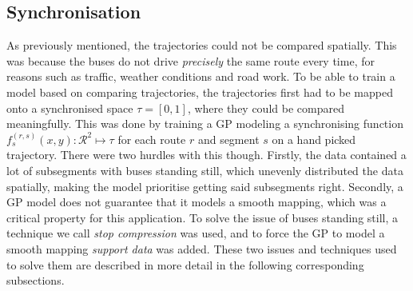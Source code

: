 \subsection{Synchronisation}
As previously mentioned, the trajectories could not be compared spatially. This was because the buses do not drive \textit{precisely} the same route every time, for reasons such as traffic, weather conditions and road work. To be able to train a model based on comparing trajectories, the trajectories first had to be mapped onto a synchronised space $\tau = [0, 1]$, where they could be compared meaningfully. This was done by training a GP modeling a synchronising function $f^{(r,s)}_s(x, y) : \mathcal{R}^2 \mapsto \tau$ for each route $r$ and segment $s$ on a hand picked trajectory. There were two hurdles with this though. Firstly, the data contained a lot of subsegments with buses standing still, which unevenly distributed the data spatially, making the model prioritise getting said subsegments right. Secondly, a GP model does not guarantee that it models a smooth mapping, which was a critical property for this application. To solve the issue of buses standing still, a technique we call \textit{stop compression} was used, and to force the GP to model a smooth mapping \textit{support data} was added. These two issues and techniques used to solve them are described in more detail in the following corresponding subsections.

